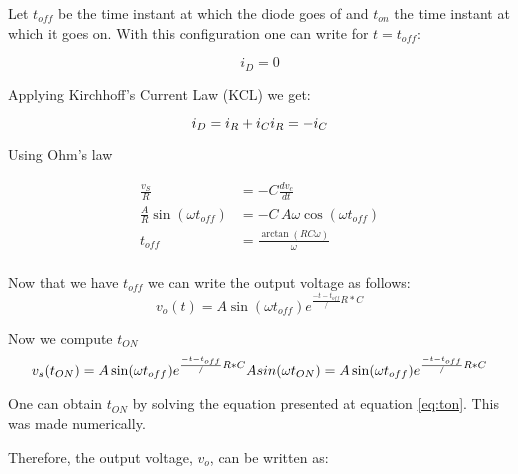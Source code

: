 Let $t_{off}$ be the time instant at which the diode goes of and $t_{on}$ the time instant at which it goes on. With this configuration one can write for $t=t_{off}$:

\begin{equation}
  i_D=0
\end{equation}

Applying Kirchhoff's Current Law (KCL) we get:

\begin{equation}
  i_D=i_R+i_C\\
  i_R=-i_C
\end{equation}

Using Ohm's law

\begin{equation}
\begin{split}
  \frac{v_S}{R} &=-C\frac{dv_c}{dt}\\
  \frac{A}{R}\sin(\omega t_{off}) &= - C \,A \omega \cos(\omega t_{off}) \\
  t_{off} &=\frac{\arctan(RC\omega)}{\omega}\\
\end{split}
\end{equation}

Now that we have $t_{off}$ we can write the output voltage as follows:
\begin{equation}
v_o(t)=A  \sin(\omega t_{off})  e^{\frac{-t-t_{off}}/{R*C}}
\end{equation}


Now we compute $t_{ON}$
\begin{equation}
	v_s(t_{ON})=A  \sin(\omega t_{off})  e^{\frac{-t-t_{off}}/{R*C}}\\
	A sin(\omega t_{ON})=A  \sin(\omega t_{off})  e^{\frac{-t-t_{off}}/{R*C}}
\label{eq:ton}
\end{equation}

One can obtain $t_{ON}$ by solving the equation presented at equation \ref{eq:ton}. This was made numerically.

Therefore, the output voltage, $v_o$, can be written as:

